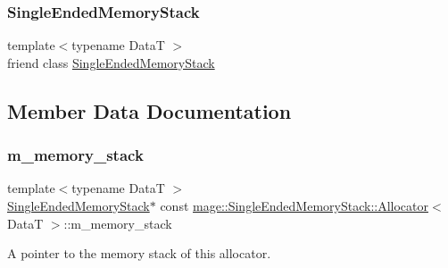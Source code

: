 \subsubsection{\texorpdfstring{Single\+Ended\+Memory\+Stack}{SingleEndedMemoryStack}}
{\footnotesize\ttfamily template$<$typename DataT $>$ \\
friend class \hyperlink{classmage_1_1_single_ended_memory_stack}{Single\+Ended\+Memory\+Stack}\hspace{0.3cm}{\ttfamily [friend]}}



\subsection{Member Data Documentation}
\hypertarget{structmage_1_1_single_ended_memory_stack_1_1_allocator_a15ef2935cbc1a207892f25148c05c45d}{}\label{structmage_1_1_single_ended_memory_stack_1_1_allocator_a15ef2935cbc1a207892f25148c05c45d} 
\subsubsection{\texorpdfstring{m\+\_\+memory\+\_\+stack}{m\_memory\_stack}}
{\footnotesize\ttfamily template$<$typename DataT $>$ \\
\hyperlink{classmage_1_1_single_ended_memory_stack}{Single\+Ended\+Memory\+Stack}$\ast$ const \hyperlink{structmage_1_1_single_ended_memory_stack_1_1_allocator}{mage\+::\+Single\+Ended\+Memory\+Stack\+::\+Allocator}$<$ DataT $>$\+::m\+\_\+memory\+\_\+stack\hspace{0.3cm}{\ttfamily [private]}}

A pointer to the memory stack of this allocator. 